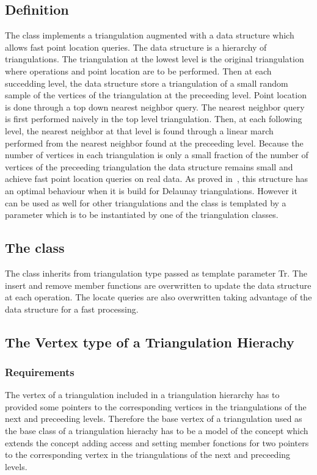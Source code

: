 \subsection{Definition}
The class 
 implements a triangulation augmented with
a data structure which allows fast point location
queries.
The
data structure  is a hierarchy 
of triangulations. The triangulation at the lowest level is
 the original triangulation where operations and point location are to 
be performed.
Then at each succedding level, the data structure
store a triangulation of a small random sample of the vertices
of the triangulation at the preceeding level. Point location
is done through a top down nearest neighbor query.
The nearest neighbor query is first
performed naively in the top level triangulation.
Then, at each following level, the nearest neighbor at that level
is found through a linear march performed from
the nearest neighbor found at the preceeding level.
Because the number of vertices in each triangulation is only a small
fraction
of the number of vertices of the preceeding triangulation 
the data structure remains small and achieve fast point location 
queries  on real
data. As proved in~\cite{d-iirdt-98}, this structure has an optimal behaviour
when it is build for Delaunay triangulations.
However it can be used as well for other triangulations
and the 
 class  is templated by a parameter
which is to be instantiated by one of the \cgal triangulation
classes.

\subsection{The class \protect {}}
The class  inherits from
triangulation type passed as template parameter Tr. 
The insert and remove member functions
are  overwritten to update the data structure at each operation.
The locate queries are also overwritten taking advantage of the data
structure for a fast processing.

\subsection{The Vertex type of a Triangulation Hierachy}
\subsubsection{Requirements}
The vertex of a triangulation  
included in a  triangulation hierarchy has to provided
some pointers to the corresponding vertices in the
triangulations of the next and preceeding levels.
Therefore the base vertex of a triangulation used as
the base class of a triangulation hierachy has to be a model of the
concept
 which extends
the concept  adding
access and setting member fonctions 
for two pointers  to the corresponding vertex in the 
triangulations of the next and preceeding levels.

